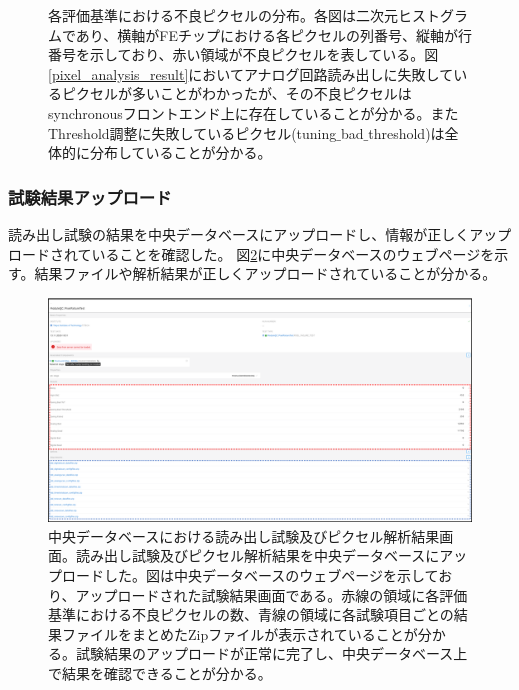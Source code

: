 \begin{figure}[bpt]
\caption[各評価基準における不良ピクセルの分布]{各評価基準における不良ピクセルの分布。各図は二次元ヒストグラムであり、横軸がFEチップにおける各ピクセルの列番号、縦軸が行番号を示しており、赤い領域が不良ピクセルを表している。図\ref{pixel_analysis_result}においてアナログ回路読み出しに失敗しているピクセルが多いことがわかったが、その不良ピクセルはsynchronousフロントエンド上に存在していることが分かる。またThreshold調整に失敗しているピクセル(tuning$\_$bad$\_$threshold)は全体的に分布していることが分かる。}
\label{pixel_analysis_result_dist}
\end{figure}

\clearpage
\subsubsection{試験結果アップロード}
読み出し試験の結果を中央データベースにアップロードし、情報が正しくアップロードされていることを確認した。
図\ref{demo_upload_to_pd}に中央データベースのウェブページを示す。結果ファイルや解析結果が正しくアップロードされていることが分かる。

\begin{figure}[bpt]\centering
\includegraphics[width=15cm]{demo_upload_to_pd}
\caption[中央データベースにおける読み出し試験及びピクセル解析結果画面]{中央データベースにおける読み出し試験及びピクセル解析結果画面。読み出し試験及びピクセル解析結果を中央データベースにアップロードした。図は中央データベースのウェブページを示しており、アップロードされた試験結果画面である。赤線の領域に各評価基準における不良ピクセルの数、青線の領域に各試験項目ごとの結果ファイルをまとめたZipファイルが表示されていることが分かる。試験結果のアップロードが正常に完了し、中央データベース上で結果を確認できることが分かる。}
\label{demo_upload_to_pd}
\end{figure}


